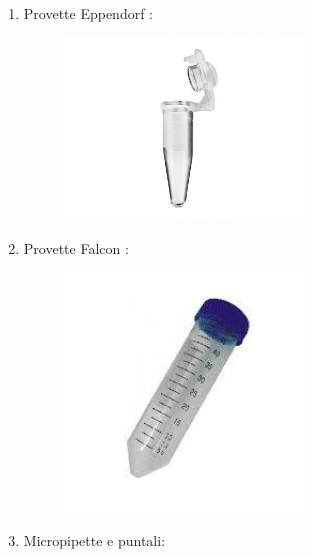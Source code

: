\documentclass{article}
\begin{document}
	\begin{enumerate}

		\item Provette Eppendorf :

		\begin{figure}[H]

			\includegraphics[width=0.6\textwidth]{./immagini/eppendorf.jpg}
			\label{eppendorf}

		\end{figure}

		\vspace{0.5cm}


		\item Provette Falcon :

		\begin{figure}[H]

			\includegraphics[width=0.6\textwidth]{./immagini/falcon.jpeg}
			\label{falcon}

		\end{figure}

		\vspace{0.5cm}


		\item Micropipette e puntali:


\end{enumerate}
\end{document}
